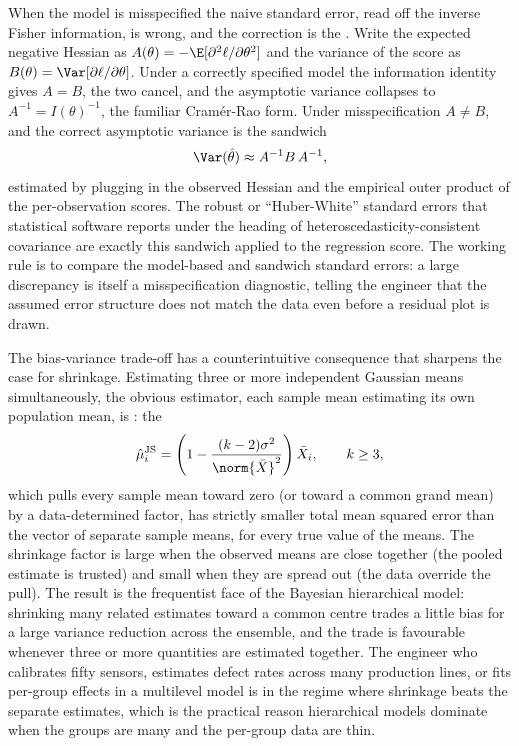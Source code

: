 \begin{mastery}
When the model is misspecified the naive standard error, read off
the inverse Fisher information, is wrong, and the correction is the
. Write the expected negative Hessian as
$A(\theta) = -\E[\partial^{2}\ell/\partial\theta^{2}]$ and the
variance of the score as $B(\theta) = \Var[\partial\ell/\partial
\theta]$. Under a correctly specified model the information identity
gives $A = B$, the two cancel, and the asymptotic variance collapses
to $A^{-1} = I(\theta)^{-1}$, the familiar Cram\'er-Rao form. Under
misspecification $A \neq B$, and the correct asymptotic variance is
the sandwich
\[
\Var(\hat{\theta}) \approx A^{-1} B\, A^{-1},
\]
estimated by plugging in the observed Hessian and the empirical
outer product of the per-observation scores. The robust or
``Huber-White'' standard errors that statistical software reports
under the heading of heteroscedasticity-consistent covariance are
exactly this sandwich applied to the regression score. The working
rule is to compare the model-based and sandwich standard errors: a
large discrepancy is itself a misspecification diagnostic, telling
the engineer that the assumed error structure does not match the
data even before a residual plot is drawn.
\end{mastery}

\begin{mastery}
The bias-variance trade-off has a counterintuitive consequence that
sharpens the case for shrinkage. Estimating three or more
independent Gaussian means simultaneously, the obvious estimator,
each sample mean estimating its own population mean, is
: the 
\[
\hat{\mu}^{\mathrm{JS}}_{i} = \left(1 -
\frac{(k-2)\sigma^{2}}{\norm{\bar{X}}^{2}}\right)\bar{X}_{i},
\qquad k \geq 3,
\]
which pulls every sample mean toward zero (or toward a common grand
mean) by a data-determined factor, has strictly smaller total mean
squared error than the vector of separate sample means, for every
true value of the means. The shrinkage factor is large when the
observed means are close together (the pooled estimate is trusted)
and small when they are spread out (the data override the pull). The
result is the frequentist face of the Bayesian hierarchical model:
shrinking many related estimates toward a common centre trades a
little bias for a large variance reduction across the ensemble, and
the trade is favourable whenever three or more quantities are
estimated together. The engineer who calibrates fifty sensors,
estimates defect rates across many production lines, or fits
per-group effects in a multilevel model is in the regime where
shrinkage beats the separate estimates, which is the practical
reason hierarchical models dominate when the groups are many and the
per-group data are thin.
\end{mastery}

